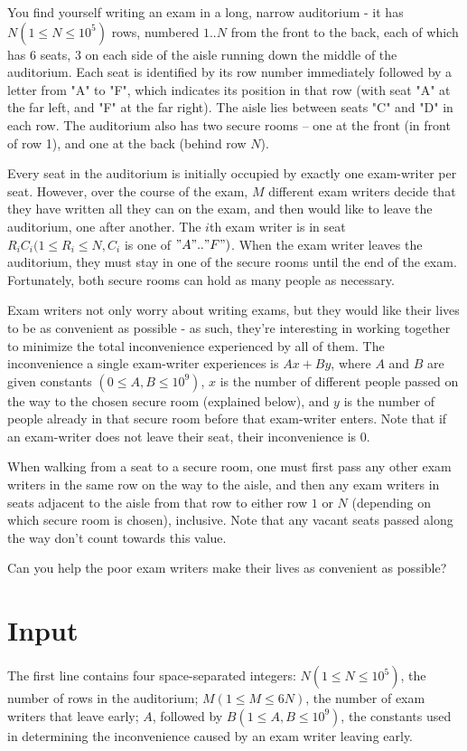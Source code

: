 
You find yourself writing an exam in a long, narrow auditorium - it has $N (1 \leq N \leq 10^5)$ rows, numbered $1..N$ from the front to the back, each of which has $6$ seats, $3$ on each side of the aisle running down the middle of the auditorium. Each seat is identified by its row number immediately followed by a letter from "A" to "F", which indicates its position in that row (with seat "A" at the far left, and "F" at the far right). The aisle lies between seats "C" and "D" in each row. The auditorium also has two secure rooms – one at the front (in front of row 1), and one at the back (behind row $N$). 

Every seat in the auditorium is initially occupied by exactly one exam-writer per seat. However, over the course of the exam, $M$ different exam writers decide that they have written all they can on the exam, and then would like to leave the auditorium, one after another. The $i$th exam writer is in seat $R_iC_i (1 \leq R_i \leq N, C_i$ is one of $"A".."F")$. When the exam writer leaves the auditorium, they must stay in one of the secure rooms until the end of the exam. Fortunately, both secure rooms can hold as many people as necessary.

Exam writers not only worry about writing exams, but they would like their lives to be as convenient as possible - as such, they're interesting in working together to minimize the total inconvenience experienced by all of them. The inconvenience a single exam-writer experiences is $Ax+By$, where $A$ and $B$ are given constants $(0 \leq A,B \leq 10^9)$, $x$ is the number of different people passed on the way to the chosen secure room (explained below), and $y$ is the number of people already in that secure room before that exam-writer enters. Note that if an exam-writer does not leave their seat, their inconvenience is $0$.

When walking from a seat to a secure room, one must first pass any other exam writers in the same row on the way to the aisle, and then any exam writers in seats adjacent to the aisle from that row to either row $1$ or $N$ (depending on which secure room is chosen), inclusive. Note that any vacant seats passed along the way don't count towards this value.

Can you help the poor exam writers make their lives as convenient as possible?

\section*{Input}
The first line contains four space-separated integers: $N (1 \leq N \leq 10^5)$, the number of rows in the auditorium; $M (1 \leq M \leq 6N)$, the number of exam writers that leave early; $A$, followed by $B (1 \leq A,B \leq 10^9)$, the constants used in determining the inconvenience caused by an exam writer leaving early.

